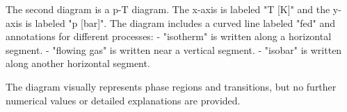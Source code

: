 The second diagram is a p-T diagram. The x-axis is labeled "T [K]" and the y-axis is labeled "p [bar]". The diagram includes a curved line labeled "fed" and annotations for different processes:  
- "isotherm" is written along a horizontal segment.  
- "flowing gas" is written near a vertical segment.  
- "isobar" is written along another horizontal segment.  

The diagram visually represents phase regions and transitions, but no further numerical values or detailed explanations are provided.